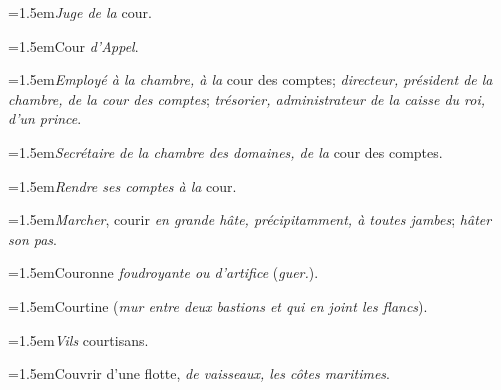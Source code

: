 \par{\dictfontsize\hangindent=1.5em\noindent \textit{Juge de la} cour. \par}
\par{\dictfontsize\hangindent=1.5em\noindent Cour \textit{d’Appel}. \par}
\par{\dictfontsize\hangindent=1.5em\noindent \textit{Employé à la chambre, à la} cour des comptes; \textit{directeur, président de la chambre, de la cour des comptes}; \textit{trésorier, administrateur de la caisse du roi, d’un prince}. \par}
\par{\dictfontsize\hangindent=1.5em\noindent \textit{Secrétaire de la chambre des domaines, de la} cour des comptes. \par}
\par{\dictfontsize\hangindent=1.5em\noindent \textit{Rendre ses comptes à la} cour. \par}
\par{\dictfontsize\hangindent=1.5em\noindent \textit{Marcher}, courir \textit{en grande hâte, précipitamment, à toutes jambes}; \textit{hâter son pas}. \par}
\par{\dictfontsize\hangindent=1.5em\noindent Couronne \textit{foudroyante ou d’artifice} (\textit{guer.}). \par}
\par{\dictfontsize\hangindent=1.5em\noindent Courtine (\textit{mur entre deux bastions et qui en joint les flancs}). \par}
\par{\dictfontsize\hangindent=1.5em\noindent \textit{Vils} courtisans. \par}
\par{\dictfontsize\hangindent=1.5em\noindent Couvrir d’une flotte, \textit{de vaisseaux, les côtes maritimes}. \par}
